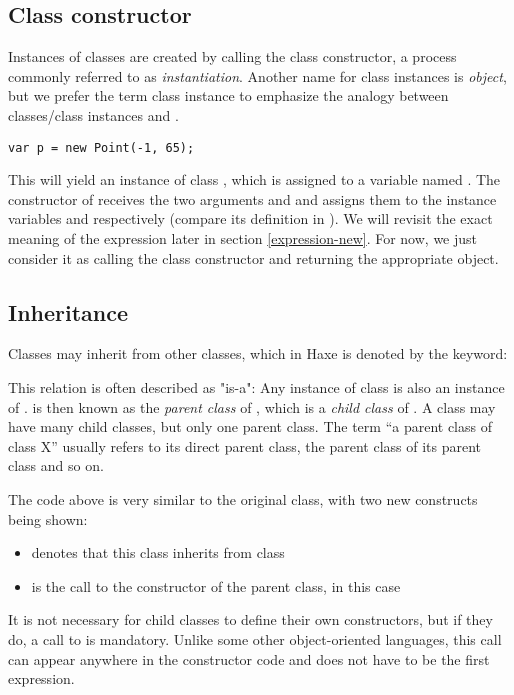 \subsection{Class constructor}
\label{types-class-constructor}

Instances of classes are created by calling the class constructor, a process commonly referred to as \emph{instantiation}. Another name for class instances is \emph{object}, but we prefer the term class instance to emphasize the analogy between classes/class instances and . 

\begin{lstlisting}
var p = new Point(-1, 65);
\end{lstlisting}
This will yield an instance of class , which is assigned to a variable named . The constructor of  receives the two arguments  and  and assigns them to the instance variables  and  respectively (compare its definition in ). We will revisit the exact meaning of the  expression later in section \ref{expression-new}. For now, we just consider it as calling the class constructor and returning the appropriate object.



\subsection{Inheritance}
\label{types-class-inheritance}

Classes may inherit from other classes, which in Haxe is denoted by the  keyword:

This relation is often described as "is-a": Any instance of class  is also an instance of .  is then known as the \emph{parent class} of , which is a \emph{child class} of . A class may have many child classes, but only one parent class. The term ``a parent class of class X'' usually refers to its direct parent class, the parent class of its parent class and so on.

The code above is very similar to the original  class, with two new constructs being shown:
\begin{itemize}
 \item {} denotes that this class inherits from class 
 \item {} is the call to the constructor of the parent class, in this case 
\end{itemize}
It is not necessary for child classes to define their own constructors, but if they do, a call to  is mandatory. Unlike some other object-oriented languages, this call can appear anywhere in the constructor code and does not have to be the first expression.

